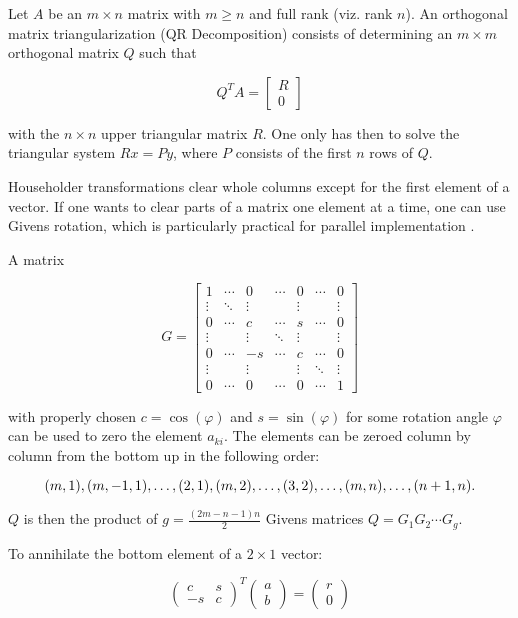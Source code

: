 \documentclass[12pt]{article}
\begin{document}
Let $A$ be an $m \times n$ matrix with $m \ge n$  and full rank (viz. rank $n$). An orthogonal matrix triangularization (QR Decomposition) consists of determining an $m \times m$ orthogonal matrix $Q$ such that

$$ Q^T A = \begin{bmatrix} R \\ 0 \end{bmatrix} $$

with the $n \times n$ upper triangular matrix $R$. One only has then to solve the triangular system $Rx = Py$, where $P$ consists of the first $n$ rows of $Q$.

Householder transformations clear whole columns except for the first element of a vector. If one wants to clear parts of a matrix one element at a time, one can use Givens rotation, which is particularly practical for parallel implementation .

A matrix

$$ G = \begin{bmatrix}
1 & \cdots & 0 & \cdots & 0 & \cdots & 0 \\
\vdots & \ddots & \vdots & \; & \vdots & \; & \vdots \\
0 & \cdots & c & \cdots & s & \cdots & 0 \\
\vdots & \; & \vdots & \ddots & \vdots & \; & \vdots \\
0 & \cdots & -s & \cdots & c & \cdots & 0 \\
\vdots & \; & \vdots & \; & \vdots & \ddots & \vdots \\
0 & \cdots & 0 & \cdots & 0 & \cdots & 1 
\end{bmatrix} $$

with properly chosen $c=\cos(\varphi)$ and $s=\sin(\varphi)$ for some rotation angle $\varphi$ can be used to zero the element $a_{ki}$. The elements can be zeroed column by column from the bottom up in the following order:

$$(m,1),(m,-1,1),\ldots,(2,1),(m,2),\ldots, \\
 (3,2),\ldots,(m,n),\ldots,(n+1,n).$$

$Q$ is then the product of $g = \frac{\left( 2m -n -1 \right)n}{2}$ Givens matrices $Q=G_1G_2\cdots G_g$.

To annihilate the bottom element of a $2 \times 1$ vector:

$$ \begin{pmatrix}c & s \\ -s & c\end{pmatrix}^T \begin{pmatrix} a \\ b \end{pmatrix} = \begin{pmatrix}r \\ 0\end{pmatrix} $$
\end{document}
